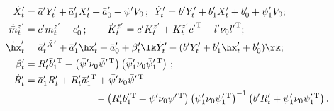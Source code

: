 \begin{align*}


\dot X_t' &= \bar a' Y_t' + \bar a_1' X_t' + \bar a_0' + \bar\psi' V_0\,;\enskip


    \dot Y_t' = \bar b' Y_t' + \bar b_1' X_t' + \bar b_0' + \bar\psi_1' V_0; %


\\


\dot{\bar m}_t^{z'} &= c' m_t^{z'}+ c_0'\,;\qquad 


\dot K_t^{\bar z'} =c' K_t^{z'} + K_t^{z'} {c'}^{\mathrm{T}} + 


l' \nu_0 {l'}^{\mathrm{T}}; %


\\


\dot{\hx}_t' &= \bar{a}_t^{\prime\,{\hat{X}^\prime}}+


\bar{a}_1^\prime 


\hx_t'+\bar a_0' +\beta_t' \lk \dot Y_t' - (\bar  b' Y_t' +\bar b_1' \hx_t' + \bar b_0')\rk;




\\


\beta_t' &= R_t' {\bar b}_1^{\prime\,{\mathrm{T}}} + 


\left(\bar \psi' \nu_0 {\bar\psi}^{\prime\,\mathrm{T}}\right)


\left({\bar \psi}_1' \nu_0 {\bar\psi}_1^{\prime\,\mathrm{T}}\right)\,; %


\\


\dot R_t' &=\bar a_1' R_t' + R_t' \bar{a}_1^{\prime\,\mathrm{T}} + 


\bar \psi' \nu_0 {\bar\psi}^{\prime\,\mathrm{T}} -{}\\


&\hspace*{25mm}{}-


\left( R_t' \bar b_1^{\prime\,\mathrm{T}} + 


\bar \psi' \nu_0 {\bar\psi}^{\prime\,\mathrm{T}}\right)


\left( \bar{\psi}_1^\prime \nu_0 \bar{\psi}_1^{\prime\,\mathrm{T}}\right)^{-1} 


\left(\bar b^\prime R_t^\prime + \bar \psi_1^\prime 


\nu_0 \bar{\psi}_1^{\prime\,\mathrm{T}}\right).




\end{align*}





